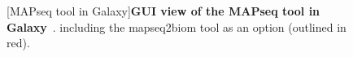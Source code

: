 \begin{figure}[H]
  \centering
  [MAPseq tool in Galaxy]{\textbf{GUI view of the MAPseq tool in Galaxy}~\cite{noauthor_tools-iuctoolsmapseq_nodate}. including the mapseq2biom tool as an option (outlined in red).} \label{fig:MAPseq}%
\end{figure}